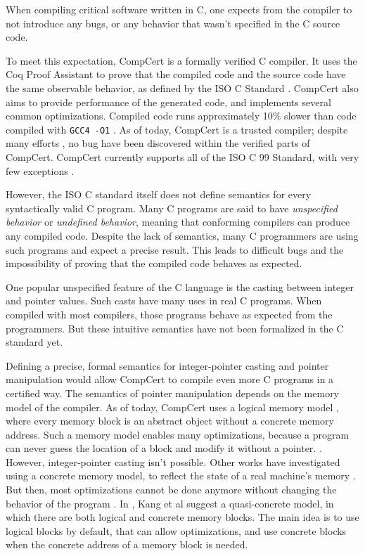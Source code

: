 When compiling critical software written in C, one expects from the compiler to not introduce any bugs, or any behavior that wasn't specified in the C source code.

To meet this expectation, CompCert  is a formally verified C compiler.
It uses the Coq Proof Assistant  to prove that the compiled code and the source code have the same observable behavior, as defined by the ISO C Standard . CompCert also aims to provide performance of the generated code, and implements several common optimizations. Compiled code runs approximately 10\% slower than code compiled with \texttt{GCC4 -O1} .
As of today, CompCert is a trusted compiler; despite many efforts , no bug have been discovered within the verified parts of CompCert.
CompCert currently supports all of the ISO C 99 Standard, with very few exceptions .

However, the ISO C standard itself does not define semantics for every syntactically valid C program.
Many C programs are said to have \textit{unspecified behavior} or \textit{undefined behavior}, meaning that conforming compilers can produce any compiled code.
Despite the lack of semantics, many C programmers are using such programs and expect a precise result. %
This leads to difficult bugs  and the impossibility of proving that the compiled code behaves as expected.

One popular unspecified feature of the C language is the casting between integer and pointer values.
Such casts have many uses in real C programs. 
When compiled with most compilers, those programs behave as expected from the programmers. But these intuitive semantics have not been formalized in the C standard yet.

Defining a precise, formal semantics for integer-pointer casting and pointer manipulation would allow CompCert to compile even more C programs in a certified way.
The semantics of pointer manipulation depends on the memory model of the compiler.
As of today, CompCert uses a logical memory model , where every memory block is an abstract object without a concrete memory address. Such a memory model enables many optimizations, because a program can never guess the location of a block and modify it without a pointer. .
However, integer-pointer casting isn't possible.
Other works have investigated using a concrete memory model, to reflect the state of a real machine's memory . But then, most optimizations cannot be done anymore without changing the behavior of the program .
In , Kang et al suggest a quasi-concrete model, in which there are both logical and concrete memory blocks. The main idea is to use logical blocks by default, that can allow optimizations, and use concrete blocks when the concrete address of a memory block is needed.

